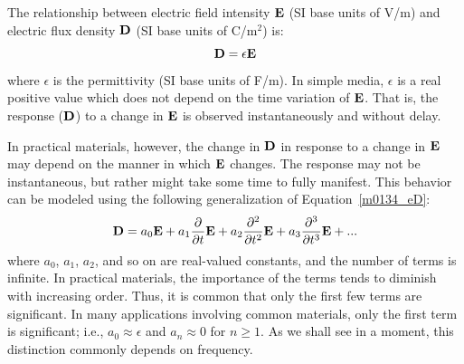 

\label{m0134_Complex_Permittivity} %

The relationship between 
electric field intensity ${\bf E}$ (SI base units of V/m)
and 
electric flux density ${\bf D}$ (SI base units of C/m$^2$)
is:
%
\begin{equation}
{\bf D} = \epsilon{\bf E}
\label{m0134_eD}
\end{equation}
%
where 
$\epsilon$ is the permittivity (SI base units of F/m).
In simple media, $\epsilon$ is a real positive value which does not depend on the time variation of ${\bf E}$.
That is, the response (${\bf D}$) to a change in ${\bf E}$ is observed instantaneously and without delay.

In practical materials, however, the change in ${\bf D}$ in response to a change in ${\bf E}$ may depend on the manner in which ${\bf E}$ changes.
The response may not be instantaneous, but rather might take some time to fully manifest. 
This behavior can be modeled using the following generalization of Equation~\ref{m0134_eD}:
%
\begin{equation}
{\bf D} = a_0{\bf E} + a_1 \frac{\partial}{\partial t} {\bf E} + a_2 \frac{\partial^2}{\partial t^2} {\bf E} + a_3 \frac{\partial^3}{\partial t^3} {\bf E} + ...
\label{m0134_ee}
\end{equation}
%
where $a_0$, $a_1$, $a_2$, and so on are real-valued constants, and the number of terms is infinite.
In practical materials, the importance of the terms tends to diminish with increasing order.
Thus, it is common that only the first few terms are significant. 
In many applications involving common materials, only the first term is significant; i.e., $a_0\approx\epsilon$ and $a_n\approx 0$ for $n\ge 1$.
As we shall see in a moment, this distinction commonly depends on frequency.  

